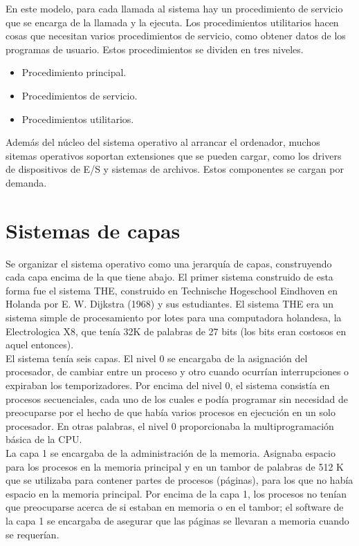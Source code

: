 \documentclass[10pt,a4paper,spanish]{report}
\begin{document}
  \noindent
  En este modelo, para cada llamada al sistema hay un procedimiento de servicio que se encarga de la llamada y la ejecuta. Los procedimientos utilitarios hacen cosas que necesitan varios procedimientos de servicio, como obtener datos de los programas de usuario. Estos procedimientos se dividen en tres niveles.

  \begin{itemize}
    \item Procedimiento principal.
    \item Procedimientos de servicio.
    \item Procedimientos utilitarios.
  \end{itemize}

  \noindent
  Además del núcleo del sistema operativo al arrancar el ordenador, muchos sitemas operativos soportan extensiones que se pueden cargar, como los drivers de dispositivos de E/S y sistemas de archivos. Estos componentes se cargan por demanda.


  \section{Sistemas de capas}

  \noindent
  Se organizar el sistema operativo como una jerarquía de capas, construyendo cada capa encima de la que tiene abajo. El primer sistema construido de esta forma fue el sistema THE, construido en Technische Hogeschool Eindhoven en Holanda por E. W. Dijkstra (1968) y sus estudiantes. El sistema THE era un sistema simple de procesamiento por lotes para una computadora holandesa, la Electrologica X8, que tenía 32K de palabras de 27 bits (los bits eran costosos en aquel entonces). \\

  \noindent
  El sistema tenía seis capas. El nivel 0 se encargaba de la asignación del procesador, de cambiar entre un proceso y otro cuando ocurrían interrupciones o expiraban los temporizadores. Por encima del nivel 0, el sistema consistía en procesos secuenciales, cada uno de los cuales e podía programar sin necesidad de preocuparse por el hecho de que había varios procesos en ejecución en un solo procesador. En otras palabras, el nivel 0 proporcionaba la multiprogramación básica de la CPU. \\

  \noindent
  La capa 1 se encargaba de la administración de la memoria. Asignaba espacio para los procesos en la memoria principal y en un tambor de palabras de 512 K que se utilizaba para contener partes de procesos (páginas), para los que no había espacio en la memoria principal. Por encima de la capa 1, los procesos no tenían que preocuparse acerca de si estaban en memoria o en el tambor; el software de la capa 1 se encargaba de asegurar que las páginas se llevaran a memoria cuando se requerían. \\
\end{document}
